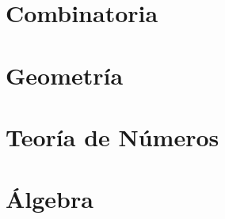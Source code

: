 \chapter{Combinatoria}\label{sol:chapter:combinatoria}


\chapter{Geometr\'ia}\label{sol:chapter:geometria}


\chapter{Teor\'ia de N\'umeros}\label{sol:chapter:teoria_de_numeros}


\chapter{\'Algebra}\label{sol:chapter:algebra}
